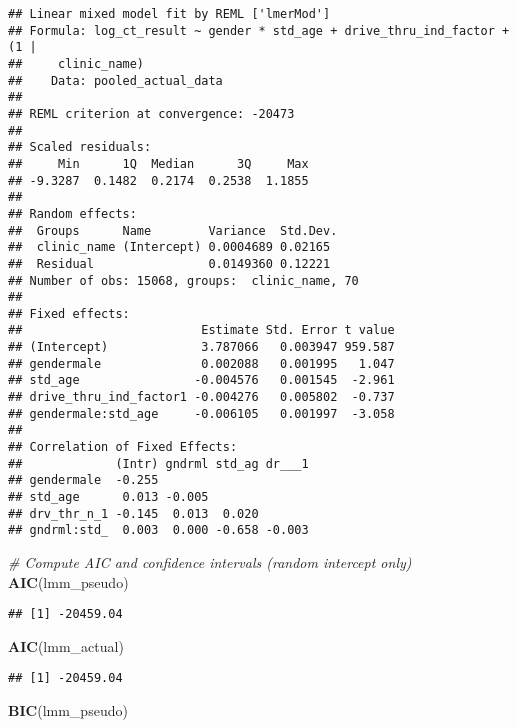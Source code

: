 \documentclass[
]{article}
\newenvironment{Shaded}{\begin{snugshade}}{\end{snugshade}}
\newcommand{\CommentTok}[1]{\textcolor[rgb]{0.56,0.35,0.01}{\textit{#1}}}
\newcommand{\FunctionTok}[1]{\textcolor[rgb]{0.13,0.29,0.53}{\textbf{#1}}}
\newcommand{\NormalTok}[1]{#1}
\begin{document}
\begin{verbatim}
## Linear mixed model fit by REML ['lmerMod']
## Formula: log_ct_result ~ gender * std_age + drive_thru_ind_factor + (1 |  
##     clinic_name)
##    Data: pooled_actual_data
## 
## REML criterion at convergence: -20473
## 
## Scaled residuals: 
##     Min      1Q  Median      3Q     Max 
## -9.3287  0.1482  0.2174  0.2538  1.1855 
## 
## Random effects:
##  Groups      Name        Variance  Std.Dev.
##  clinic_name (Intercept) 0.0004689 0.02165 
##  Residual                0.0149360 0.12221 
## Number of obs: 15068, groups:  clinic_name, 70
## 
## Fixed effects:
##                         Estimate Std. Error t value
## (Intercept)             3.787066   0.003947 959.587
## gendermale              0.002088   0.001995   1.047
## std_age                -0.004576   0.001545  -2.961
## drive_thru_ind_factor1 -0.004276   0.005802  -0.737
## gendermale:std_age     -0.006105   0.001997  -3.058
## 
## Correlation of Fixed Effects:
##             (Intr) gndrml std_ag dr___1
## gendermale  -0.255                     
## std_age      0.013 -0.005              
## drv_thr_n_1 -0.145  0.013  0.020       
## gndrml:std_  0.003  0.000 -0.658 -0.003
\end{verbatim}

\begin{Shaded}
\begin{Highlighting}[]
\CommentTok{\# Compute AIC and confidence intervals (random intercept only)}
\FunctionTok{AIC}\NormalTok{(lmm\_pseudo)}
\end{Highlighting}
\end{Shaded}

\begin{verbatim}
## [1] -20459.04
\end{verbatim}

\begin{Shaded}
\begin{Highlighting}[]
\FunctionTok{AIC}\NormalTok{(lmm\_actual)}
\end{Highlighting}
\end{Shaded}

\begin{verbatim}
## [1] -20459.04
\end{verbatim}

\begin{Shaded}
\begin{Highlighting}[]
\FunctionTok{BIC}\NormalTok{(lmm\_pseudo)}
\end{Highlighting}
\end{Shaded}
\end{document}
